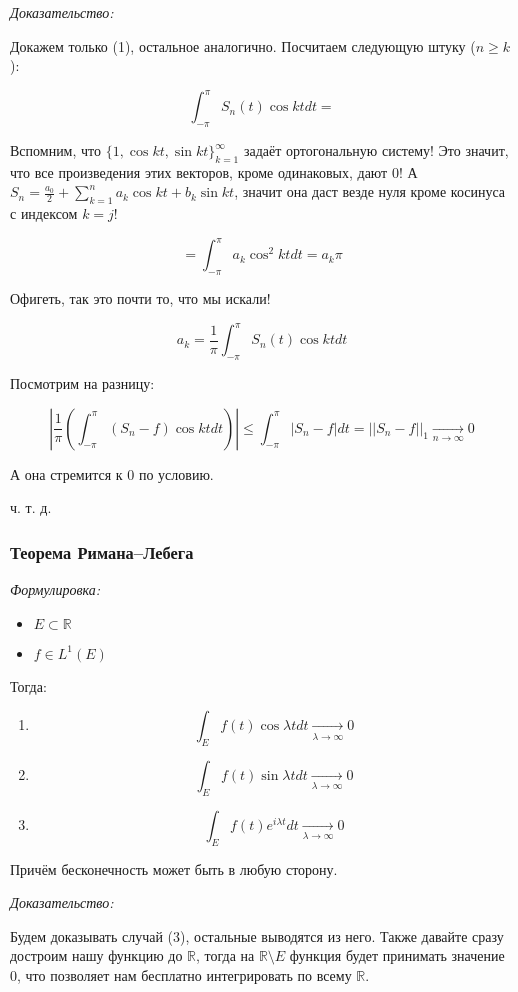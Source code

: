 \documentclass{article}
\def\goesto#1{\underset{#1}{\longrightarrow}}
\def\toinf#1{\goesto{#1 \rightarrow \infty}}
\def\ntoinf{\toinf{n}}
\begin{document}
\textit{Доказательство:}

Докажем только (1), остальное аналогично. Посчитаем следующую штуку ($n \ge k$):

\[\int_{-\pi}^{\pi} S_n(t) \cos kt dt = \]

Вспомним, что $\{1, \cos kt, \sin kt\}_{k = 1}^{\infty}$ задаёт ортогональную систему! Это значит, что все произведения этих векторов, кроме одинаковых, дают 0! А $S_n = \frac{a_0}{2} + \sum_{k = 1}^{n} a_k \cos kt + b_k \sin kt$, значит она даст везде нуля кроме косинуса с индексом $k = j$!

\[ = \int_{-\pi}^{\pi} a_k \cos^2 kt dt = a_k \pi\]

Офигеть, так это почти то, что мы искали!

\[a_k = \frac{1}{\pi} \int_{-\pi}^{\pi} S_n(t) \cos kt dt\]

Посмотрим на разницу:

\[\left|\frac{1}{\pi} \left( \int_{-\pi}^{\pi} (S_n - f) \cos kt dt \right)\right| \le \int_{-\pi}^{\pi} |S_n - f| dt = ||S_n - f||_1 \ntoinf 0\]

А она стремится к 0 по условию.

ч. т. д. 

\subsubsection{Теорема Римана--Лебега}
\textit{Формулировка:}

\begin{itemize}
    \item $E \subset \mathbb{R}$
    \item $f \in L^1(E)$
\end{itemize}

Тогда:

\begin{enumerate}
    \item \[\int_{E} f(t) \cos \lambda t dt \goesto{\lambda \rightarrow \infty} 0\]
    \item \[\int_{E} f(t) \sin \lambda t dt \goesto{\lambda \rightarrow \infty} 0\]
    \item \[\int_{E} f(t) e^{i \lambda t} dt \goesto{\lambda \rightarrow \infty} 0\]
\end{enumerate}

Причём бесконечность может быть в любую сторону.

\textit{Доказательство:}

Будем доказывать случай (3), остальные выводятся из него. Также давайте сразу достроим нашу функцию до $\mathbb{R}$, тогда на $\mathbb{R} \setminus E$ функция будет принимать значение 0, что позволяет нам бесплатно интегрировать по всему $\mathbb{R}$.
\end{document}
